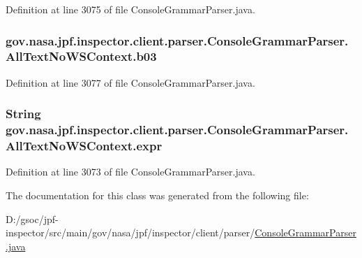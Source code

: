 Definition at line 3075 of file Console\+Grammar\+Parser.\+java.

\subsubsection[{\texorpdfstring{b03}{b03}}]{ gov.\+nasa.\+jpf.\+inspector.\+client.\+parser.\+Console\+Grammar\+Parser.\+All\+Text\+No\+W\+S\+Context.\+b03}\hypertarget{classgov_1_1nasa_1_1jpf_1_1inspector_1_1client_1_1parser_1_1_console_grammar_parser_1_1_all_text_no_w_s_context_ab9506f66e6cfaf85fcb0fc0fbe6e7098}{}\label{classgov_1_1nasa_1_1jpf_1_1inspector_1_1client_1_1parser_1_1_console_grammar_parser_1_1_all_text_no_w_s_context_ab9506f66e6cfaf85fcb0fc0fbe6e7098}


Definition at line 3077 of file Console\+Grammar\+Parser.\+java.

\subsubsection[{\texorpdfstring{expr}{expr}}]{\setlength{\rightskip}{0pt plus 5cm}String gov.\+nasa.\+jpf.\+inspector.\+client.\+parser.\+Console\+Grammar\+Parser.\+All\+Text\+No\+W\+S\+Context.\+expr}\hypertarget{classgov_1_1nasa_1_1jpf_1_1inspector_1_1client_1_1parser_1_1_console_grammar_parser_1_1_all_text_no_w_s_context_a1157742947f1a47c7e7ed2856f080e25}{}\label{classgov_1_1nasa_1_1jpf_1_1inspector_1_1client_1_1parser_1_1_console_grammar_parser_1_1_all_text_no_w_s_context_a1157742947f1a47c7e7ed2856f080e25}


Definition at line 3073 of file Console\+Grammar\+Parser.\+java.



The documentation for this class was generated from the following file\+:\begin{DoxyCompactItemize}
\item 
D\+:/gsoc/jpf-\/inspector/src/main/gov/nasa/jpf/inspector/client/parser/\hyperlink{_console_grammar_parser_8java}{Console\+Grammar\+Parser.\+java}\end{DoxyCompactItemize}
